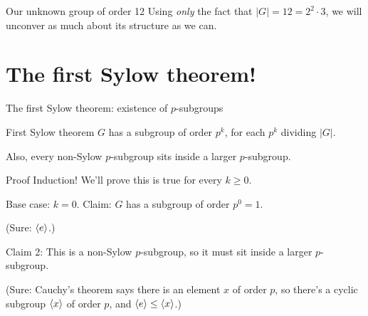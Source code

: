 \documentclass[8pt, handout]{beamer}
\newcommand{\Pause}{\pause}      %
\begin{document}
\begin{frame}{Our unknown group of order 12}
  Using \emph{only} the fact that $|G|=12 = 2^2 \cdot 3$, we will unconver
  as much about its structure as we can. 
  
\end{frame}


\section{The first Sylow theorem!}


\begin{frame}{The first Sylow theorem: existence of $p$-subgroups}
  
  \begin{block}{First Sylow theorem} 
    $G$ has a subgroup of order $p^k$, for each $p^k$ dividing
    $|G|$. \medskip
    
    Also, every non-Sylow $p$-subgroup sits inside a larger
    $p$-subgroup.
  \end{block}

  \begin{exampleblock}{Proof} \Pause
    Induction! \Pause We'll prove this is true for every $k \geq 0$.

    \medskip

    Base case: $k=0$. \Pause Claim: $G$ has a subgroup of order $p^0 = 1$. 
    
    \smallskip\Pause

    (Sure: $\langle e\rangle$.) \Pause 
    
    \smallskip \Pause
    Claim 2: This is a non-Sylow $p$-subgroup, so it must sit inside a larger $p$-subgroup. \Pause 
    
    \smallskip \Pause
    (Sure: Cauchy's theorem says there is an element $x$ of order $p$, so there's a cyclic subgroup $\langle x\rangle$ of order $p$, and $\langle e\rangle \leq \langle x\rangle$.)
    
  \end{exampleblock}
\end{frame}

\end{document}
